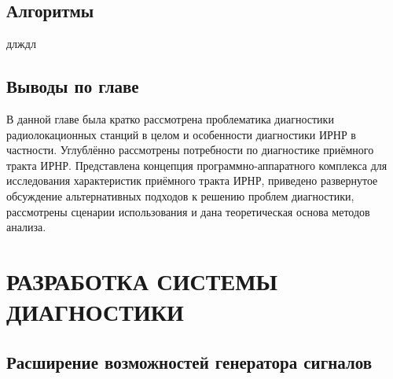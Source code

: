 \documentclass{report}
\begin{document}

\section{Алгоритмы}

длждл

\section*{Выводы по главе}

В данной главе была кратко рассмотрена проблематика диагностики радиолокационных станций в целом и особенности диагностики ИРНР в частности. Углублённо рассмотрены потребности по диагностике приёмного тракта ИРНР. Представлена концепция программно-аппаратного комплекса для исследования характеристик приёмного тракта ИРНР, приведено развернутое обсуждение альтернативных подходов к решению проблем диагностики, рассмотрены сценарии использования и дана теоретическая основа методов анализа.

\chapter{РАЗРАБОТКА СИСТЕМЫ ДИАГНОСТИКИ}
\setcounter{section}{0}
\setcounter{subsection}{0}
\setcounter{equation}{0}
\section{Расширение возможностей генератора сигналов}
\end{document}
